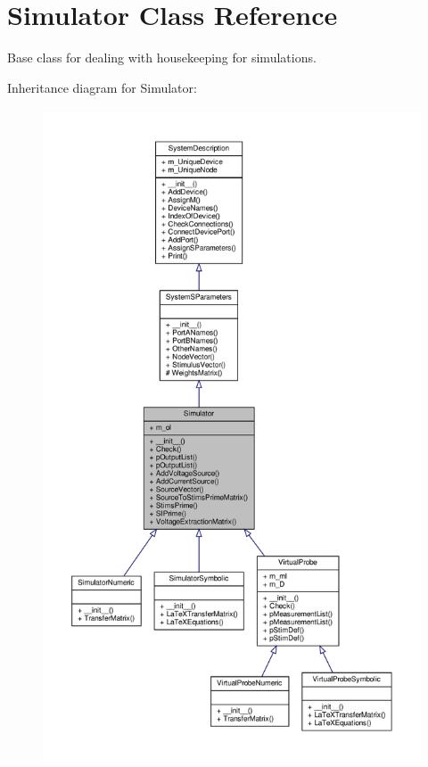 \hypertarget{classSignalIntegrity_1_1SystemDescriptions_1_1Simulator_1_1Simulator}{}\section{Simulator Class Reference}
\label{classSignalIntegrity_1_1SystemDescriptions_1_1Simulator_1_1Simulator}


Base class for dealing with housekeeping for simulations.  




Inheritance diagram for Simulator\+:
\nopagebreak
\begin{figure}[H]
\begin{center}
\leavevmode
\includegraphics[height=550pt]{classSignalIntegrity_1_1SystemDescriptions_1_1Simulator_1_1Simulator__inherit__graph}
\end{center}
\end{figure}


